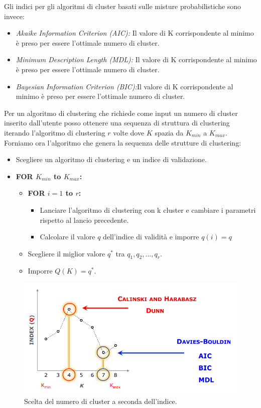 Gli indici per gli algoritmi di cluster basati sulle misture probabilistiche sono invece:
 \begin{itemize}
 	\item \textit{Akaike Information Criterion (AIC):} Il valore di K corrispondente al minimo è preso per essere l'ottimale numero di cluster.
 	\item \textit{Minimum Description Length (MDL):} Il valore di K corrispondente al minimo è preso per essere l'ottimale numero di cluster.
 	\item \textit{Bayesian Information Criterion (BIC):}Il valore di K corrispondente al minimo è preso per essere l'ottimale numero di cluster.
 \end{itemize}
 
 Per un algoritmo di clustering che richiede come input un numero di cluster inserito dall'utente posso ottenere una sequenza di struttura di clustering iterando l'algoritmo di clustering $r$ volte dove $K$ spazia da $K_{min}$ a $K_{max}$.
 Forniamo ora  l'algoritmo che genera la sequenza delle strutture di clustering:
 \begin{itemize}
 	\item Scegliere un algoritmo di clustering e un indice di validazione.
 	\item \textbf{FOR $K_{min}$ to $K_{max}$:}
 	\begin{itemize}
 		\item \textbf{FOR $i = 1$ to $r$:}
 		\begin{itemize}
 			\item Lanciare l'algoritmo di clustering con k cluster e cambiare i parametri rispetto al lancio precedente.
 			\item Calcolare il valore $q$ dell'indice di validità e imporre $q(i) = q$
 		\end{itemize}
 		\item Scegliere il miglior valore $q^{*}$ tra ${q_1, q_2,...,q_r}$.
 		\item Imporre $Q(K) = q^{*}$.		 
 	\end{itemize}
 \end{itemize}
 
 \begin{figure}[H]
 	\centering
 	\includegraphics[height=0.250 \linewidth]{clustering/pict/cluster_validity.png}
 	\caption{Scelta del numero di cluster a seconda dell'indice.}
 \end{figure}
